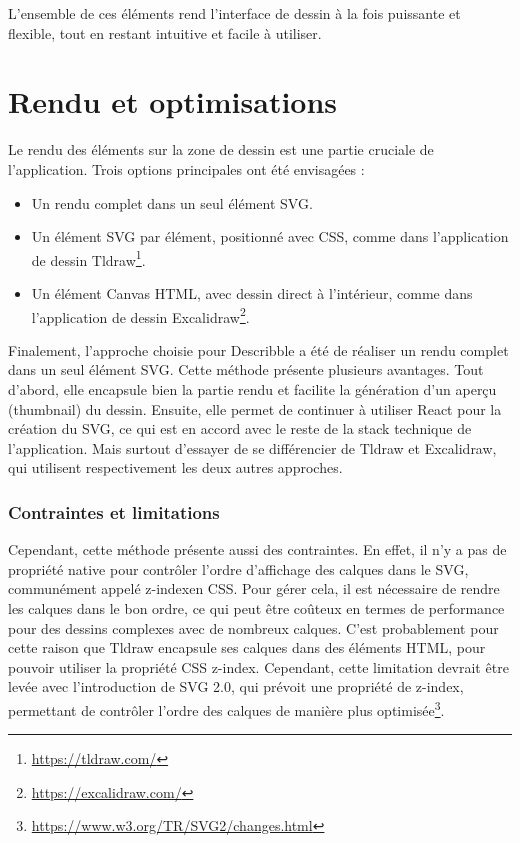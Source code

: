 L'ensemble de ces éléments rend l'interface de dessin à la fois puissante et flexible, tout en restant intuitive et facile à utiliser.

\section{Rendu et optimisations}

Le rendu des éléments sur la zone de dessin est une partie cruciale de l'application. Trois options principales ont été envisagées :

\begin{itemize}
    \item Un rendu complet dans un seul élément SVG.
    \item Un élément SVG par élément, positionné avec CSS, comme dans l'application de dessin Tldraw\footnote{\url{https://tldraw.com/}}.
    \item Un élément Canvas HTML, avec dessin direct à l'intérieur, comme dans l'application de dessin Excalidraw\footnote{\url{https://excalidraw.com/}}.
\end{itemize}

Finalement, l'approche choisie pour \Gls{Describble} a été de réaliser un rendu complet dans un seul élément SVG. Cette méthode présente plusieurs avantages. Tout d'abord, elle encapsule bien la partie rendu et facilite la génération d'un aperçu (thumbnail) du dessin. Ensuite, elle permet de continuer à utiliser React pour la création du SVG, ce qui est en accord avec le reste de la stack technique de l'application. Mais surtout d'essayer de se différencier de Tldraw et Excalidraw, qui utilisent respectivement les deux autres approches.

\subsubsection{Contraintes et limitations}

Cependant, cette méthode présente aussi des contraintes. En effet, il n'y a pas de propriété native pour contrôler l'ordre d'affichage des calques dans le SVG, communément appelé \guillemotleft z-index\guillemotright en CSS. Pour gérer cela, il est nécessaire de rendre les calques dans le bon ordre, ce qui peut être coûteux en termes de performance pour des dessins complexes avec de nombreux calques. C'est probablement pour cette raison que Tldraw encapsule ses calques dans des éléments HTML, pour pouvoir utiliser la propriété CSS \guillemotleft z-index\guillemotright. Cependant, cette limitation devrait être levée avec l'introduction de SVG 2.0, qui prévoit une propriété de z-index, permettant de contrôler l'ordre des calques de manière plus optimisée\footnote{\url{https://www.w3.org/TR/SVG2/changes.html}}.

